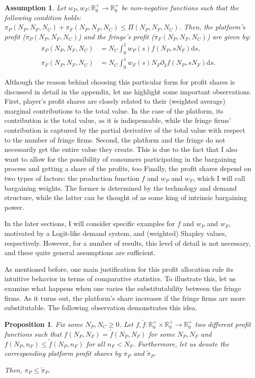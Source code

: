 \documentclass[a4paper]{article}
\newtheorem{proposition}{Proposition}
\newtheorem{assumption}{Assumption}
\newcommand{\ds}{\mathrm{d}s}
\begin{document}
\begin{assumption}
    \label{ass:profit_sharing}
    Let $w_P, w_F: \mathbb{R}^+_0 \to \mathbb{R}^+_0$ be non-negative functions such that the following condition holds: $\pi_P(N_P, N_F, N_C) + \pi_F(N_P, N_F, N_C) \leq \Pi(N_P, N_F, N_C)$.
    Then, the platform's profit ($\pi_P(N_P, N_F, N_C)$) and the fringe's profit ($\pi_F(N_P, N_F, N_C)$) are given by:
    \begin{align*}
        \pi_P(N_P, N_F, N_C) &= N_C \int_0^1 w_P(s) f(N_P, s N_F) \ds, \\
        \pi_F(N_P, N_F, N_C) &= N_C \int_0^1 w_F(s) N_F \partial_2 f(N_P, s N_F) \ds.
    \end{align*}
\end{assumption}

Although the reason behind choosing this particular form for profit shares is discussed in detail in the appendix, let me highlight some important observations.
First, player's profit shares are closely related to their (weighted average) marginal contributions to the total value.
In the case of the platform, its contribution is the total value, as it is indispensable, while the fringe firms' contribution is captured by the partial derivative of the total value with respect to the number of fringe firms.
Second, the platform and the fringe do not necessarily get the entire value they create.
This is due to the fact that I also want to allow for the possibility of consumers participating in the bargaining process and getting a share of the profits, too
Finally, the profit shares depend on two types of factors: the production function $f$ and $w_P$ and $w_F$, which I will call bargaining weights.
The former is determined by the technology and demand structure, while the latter can be thought of as some king of intrinsic bargaining power.

In the later sections, I will consider specific examples for $f$ and $w_P$ and $w_F$, motivated by a Logit-like demand system, and (weighted) Shapley values, respectively.
However, for a number of results, this level of detail is not necessary, and these quite general assumptions are sufficient.

As mentioned before, one main justification for this profit allocation rule its intuitive behavior in terms of comparative statistics.
To illustrate this, let us examine what happens when one varies the substitutability between the fringe firms.
As it turns out, the platform's share increases if the fringe firms are more substitutable.
The following observation demonstrates this idea.
\begin{proposition}
    \label{prop:outcome_based_bargaining_power}
    Fix some $N_P, N_C \geq 0$. Let $f, \tilde{f}: \mathbb{R}^+_0 \times \mathbb{R}^+_0 \to \mathbb{R}^+_0$ two different profit functions such that $f(N_P, N_F) = \tilde{f}(N_P, N_F)$ for some $N_P, N_F$ and $f(N_P, n_F) \leq \tilde{f}(N_P, n_F)$ for all $n_F < N_F$.
    Furthermore, let us denote the corresponding platform profit shares by $\pi_P$ and $\tilde{\pi}_P$.
    
    Then, $\pi_P \leq \tilde{\pi}_P$.
\end{proposition}
\end{document}
